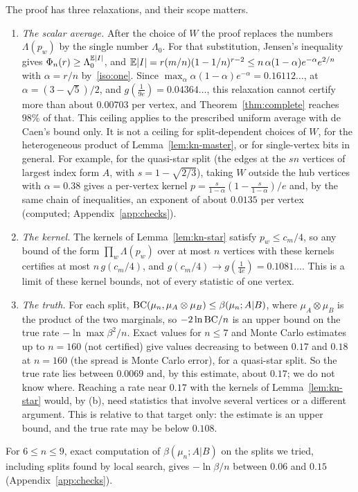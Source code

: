 \begin{remark}\label{rem:kn-ceiling}
The proof has three relaxations, and their scope matters.
\begin{enumerate}[label=(\alph*)]
\item \emph{The scalar average.} After the choice of $W$ the proof replaces the numbers $\Lambda(p_w)$ by the single number $\Lambda_0$. For that substitution, Jensen's inequality gives $\Phi_n(r)\ge\Lambda_0^{\mathbb{E}\lvert I\rvert}$, and $\mathbb{E}\lvert I\rvert=r(m/n)(1-1/n)^{r-2}\le n\,\alpha(1-\alpha)e^{-\alpha}e^{2/n}$ with $\alpha=r/n$ by~\ref{iso:one}. Since $\max_\alpha\alpha(1-\alpha)e^{-\alpha}=0.16112\ldots$, at $\alpha=(3-\sqrt5)/2$, and $g(\frac1{9e})=0.04364\ldots$, this relaxation cannot certify more than about $0.00703$ per vertex, and Theorem~\ref{thm:complete} reaches $98\%$ of that. This ceiling applies to the prescribed uniform average with de Caen's bound only. It is not a ceiling for split-dependent choices of $W$, for the heterogeneous product of Lemma~\ref{lem:kn-master}, or for single-vertex bits in general. For example, for the quasi-star split (the edges at the $s n$ vertices of largest index form $A$, with $s=1-\sqrt{2/3}$), taking $W$ outside the hub vertices with $\alpha=0.38$ gives a per-vertex kernel $p=\frac{s}{1-\alpha}(1-\frac s{1-\alpha})/e$ and, by the same chain of inequalities, an exponent of about $0.0135$ per vertex (computed; Appendix~\ref{app:checks}).
\item \emph{The kernel.} The kernels of Lemma~\ref{lem:kn-star} satisfy $p_w\le c_m/4$, so any bound of the form $\prod_w\Lambda(p_w)$ over at most $n$ vertices with these kernels certifies at most $n\,g(c_m/4)$, and $g(c_m/4)\to g(\frac1{4e})=0.1081\ldots$. This is a limit of these kernel bounds, not of every statistic of one vertex.
\item \emph{The truth.} For each split, $\mathrm{BC}(\mu_n,\mu_A\otimes\mu_B)\le\beta(\mu_n;A|B)$, where $\mu_A\otimes\mu_B$ is the product of the two marginals, so $-2\ln\mathrm{BC}/n$ is an upper bound on the true rate $-\ln\max\beta^2/n$. Exact values for $n\le7$ and Monte Carlo estimates up to $n=160$ (not certified) give values decreasing to between $0.17$ and $0.18$ at $n=160$ (the spread is Monte Carlo error), for a quasi-star split. So the true rate lies between $0.0069$ and, by this estimate, about $0.17$; we do not know where. Reaching a rate near $0.17$ with the kernels of Lemma~\ref{lem:kn-star} would, by (b), need statistics that involve several vertices or a different argument. This is relative to that target only: the estimate is an upper bound, and the true rate may be below $0.108$.
\end{enumerate}
For $6\le n\le9$, exact computation of $\beta(\mu_n;A|B)$ on the splits we tried, including splits found by local search, gives $-\ln\beta/n$ between $0.06$ and $0.15$ (Appendix~\ref{app:checks}).
\end{remark}

